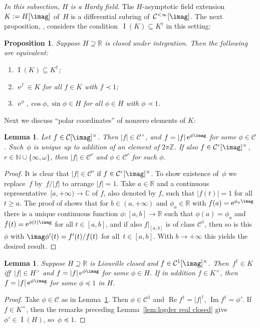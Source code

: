 \documentclass[]{amsart}
\numberwithin{equation}{section}
\newcommand{\bbold}{\mathbb}
\def\R { {\bbold R} }
\def\Z { {\bbold Z} }
\def\C { {\bbold C} }
\def\N { {\bbold N} }
\def\c {\mathcal{C}}
\def \I{\operatorname{I}}
\def \ex{\operatorname{e}}
\renewcommand{\Re}{\operatorname{Re}}
\renewcommand{\Im}{\operatorname{Im}}
\newtheorem{lemma}[theorem]{Lemma}
\newtheorem{prop}[theorem]{Proposition}
\theoremstyle{definition}
\theoremstyle{remark}
\newcommand{\abs}[1]{\lvert#1\rvert}
\renewcommand\geq{\geqslant}
\renewcommand\preceq{\preccurlyeq}
\def \Calinf{\mathcal{C}^{<\infty}}
\begin{document}
{\it In this subsection, $H$ is a Hardy field.}\/
The $H$-asymptotic field extension $K:=H[\imag]$ of~$H$ is a differential subring of~$\Calinf[\imag]$.  
The next proposition, \cite[Proposition~6.11]{ADH5}, considers the condition~${\I(K)\subseteq K^\dagger}$ in this setting:

\begin{prop}\label{prop:cos sin infinitesimal, 2}
Suppose $H\supseteq\R$ is closed under integration.  
Then the following   are equivalent:
\begin{enumerate}
\item[\textup{(i)}] $\I(K)\subseteq K^\dagger$;
\item[\textup{(ii)}] $\ex^{f}\in K$ for all $f\in K$ with $f\prec  1$;
\item[\textup{(iii)}] $\ex^\phi,\cos \phi, \sin\phi\in H$ for all $\phi\in H$ with $\phi\prec 1$.
\end{enumerate}
\end{prop}

\noindent
Next we discuss ``polar coordinates'' of nonzero elements of $K$:

\begin{lemma}\label{lem:arg}
Let $f\in\c[\imag]^\times$. Then $\abs{f}\in\c^\times$, and $f=\abs{f}\ex^{\phi\imag}$ for some $\phi\in\c$.
Such~$\phi$ is unique up to addition of
an element of $2\pi\Z$. If also $f\in\c^r[\imag]^\times$, $r\in\N\cup\{\infty,\omega\}$, then $\abs{f}\in \c^r$
and $\phi\in\c^r$ for such $\phi$.
\end{lemma}
\begin{proof}
It is clear that  $\abs{f}\in \c^r$ if $f\in\c^r[\imag]^\times$. To show existence of~$\phi$ we replace~$f$ by~$f/\abs{f}$
to arrange $\abs{f}=1$.
Take $a\in\R$ and a continuous representative~${[a,+\infty)\to \C}$ of $f$, also denoted by $f$, such that $\abs{f(t)}=1$ for all $t\geq a$.
The proof of \cite[(9.8.1)]{Dieudonne} shows that for $b\in (a,+\infty)$ and $\phi_a\in\R$ with
$f(a)=\ex^{\phi_a\imag}$
there is a unique continuous function
$\phi\colon [a,b]\to\R$ such that $\phi(a)=\phi_a$ and $f(t) = \ex^{\phi(t)\imag}$ for all $t\in [a,b]$, and if also $f|_{[a,b]}$ is of class
$\c^1$, then so is this $\phi$  with $\imag\phi'(t) = f'(t)/f(t)$ for all~$t\in[a,b]$. 
With $b\to +\infty$ this yields the desired result. 
\end{proof}

\begin{lemma}\label{lem:fexphii}
Suppose $H\supseteq\R$ is Liouville closed  and $f\in \c^1[\imag]^\times$. Then~$f^\dagger\in K$ iff~$\abs{f}\in H^>$ and  $f=\abs{f}\ex^{\phi\imag}$ for some $\phi\in H$.
If in addition $f\in K^\times$, then $f=\abs{f}\ex^{\phi\imag}$ for some $\phi\preceq 1$ in $H$.
\end{lemma}
\begin{proof}
Take $\phi\in\c$ as in Lemma~\ref{lem:arg}. Then $\phi\in\c^1$ and $\Re f^\dagger=\abs{f}^\dagger$, $\Im f^\dagger=\phi'$.
If~$f\in K^\times$, then
the remarks preceding Lemma~\ref{lem:logder real closed} give $\phi'\in \I(H)$,  so~${\phi\preceq 1}$. 
\end{proof}
 
\end{document}
